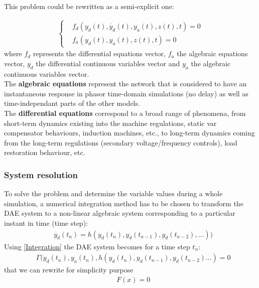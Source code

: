 \documentclass[a4paper, 12pt]{report}
\begin{document}
This problem could be rewritten as a semi-explicit one:

\begin{equation}
\begin{aligned}
\begin{cases}
& f_d(y_d(t), \dot{y_d}(t), y_a(t), z(t), t) = 0 \\
& f_a(y_d(t), y_a(t), z(t), t) = 0
\end{cases}
\end{aligned}
\end{equation}
where $f_d$ represents the differential equations vector, $f_a$ the algebraic equations vector, $y_d$ the differential continuous variables vector and $y_a$ the algebraic continuous variables vector. \\

The \textbf{algebraic equations} represent the network that is considered to have an instantaneous response in phasor time-domain simulations (no delay) as well as time-independant parts of the other models.\\

The \textbf{differential equations} correspond to a broad range of phenomena, from short-term dynamics existing into the machine regulations, static var compensator behaviours, induction machines, etc., to long-term dynamics coming from the long-term regulations (secondary voltage/frequency controls), load restoration behaviour, etc.

\subsubsection{System resolution}
\label{Dynawo_Solver_System_Resolution}

To solve the problem and determine the variable values during a whole simulation, a numerical integration method has to be chosen to transform the \ac{DAE} system to a non-linear algebraic system corresponding to a particular instant in time (time step):
\begin{equation}
\begin{aligned}
& \dot{y_d}(t_n) = h(y_d(t_n), y_d(t_{n-1}), y_d(t_{n-2}), ...))
\end{aligned}
\label{Integration}
\end{equation}
Using \eqref{Integration} the \ac{DAE} system becomes for a time step $t_n$:
\begin{equation}
\begin{aligned}
& \Gamma(y_d(t_n), y_a(t_n), h(y_d(t_n), y_d(t_{n-1}), y_d(t_{n-2}) ...) = 0
\end{aligned}
\end{equation}
that we can rewrite for simplicity purpose
\begin{equation}
\begin{aligned}
& F(x) = 0
\end{aligned}
\label{Correction}
\end{equation}
\end{document}
